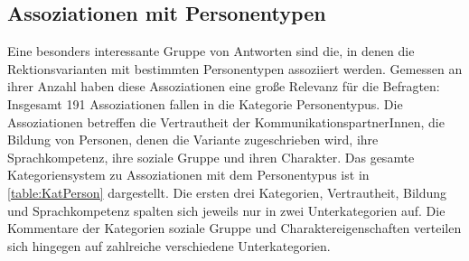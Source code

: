 \subsection{Assoziationen mit Personentypen}
\label{sec:ErgAssPersonen}
Eine besonders interessante Gruppe von Antworten sind die, in denen die Rektionsvarianten mit bestimmten Personentypen assoziiert werden. 
Gemessen an ihrer Anzahl haben diese Assoziationen eine große Relevanz für die Befragten: 
Insgesamt 191 Assoziationen fallen in die Kategorie \glqq Personentypus\grqq. 
Die Assoziationen betreffen die Vertrautheit der KommunikationspartnerInnen, die Bildung von Personen, denen die Variante zugeschrieben wird, ihre Sprachkompetenz, ihre soziale Gruppe und ihren Charakter. 
Das gesamte Kategoriensystem zu Assoziationen mit dem Personentypus ist in \autoref{table:KatPerson} dargestellt. 
Die ersten drei Kategorien, \glqq Vertrautheit\grqq, \glqq Bildung\grqq{} und \glqq Sprachkompetenz\grqq{} spalten sich jeweils nur in zwei Unterkategorien auf. 
Die Kommentare der Kategorien \glqq soziale Gruppe\grqq{} und \glqq Charaktereigenschaften\grqq{} verteilen sich hingegen auf zahlreiche verschiedene Unterkategorien. 

